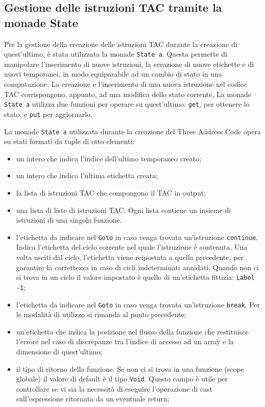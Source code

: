 \subsection{Gestione delle istruzioni TAC tramite la monade State}

Per la gestione della creazione delle istruzioni TAC durante la creazione di quest'ultimo, è stata utilizzata la monade {\tt State a}. Questa permette di manipolare l'inserimento di nuove istruzioni, la creazione di nuove etichette e di nuovi temporanei, in modo equiparabile ad un cambio di stato in una computazione. La creazione e l'inserimento di una nuova istruzione nel codice TAC corrispongono, appunto, ad una modifica dello stato corrente, La monade {\tt State a} utilizza due funzioni per operare su quest'ultimo: {\tt get}, per ottenere lo stato, e {\tt put} per aggiornarlo. 

La monade {\tt State a} utilizzata durante la creazione del Three Address Code opera su stati formati da tuple di otto elementi:
\begin{itemize}
    \item un intero che indica l'indice dell'ultimo temporaneo creato;
    \item un intero che indica l'ultima etichetta creata;
    \item la lista di istruzioni TAC che compongono il TAC in output;
    \item una lista di liste di istruzioni TAC. Ogni lista contiene un insieme di istruzioni di una singola funzione. 
    \item l'etichetta da indicare nel {\tt Goto} in caso venga trovata un'istruzione {\tt continue}. Indica l'etichetta del ciclo corrente nel quale l'istruzione è contenuta. Una volta usciti dal ciclo, l'etichetta viene reipostata a quella precedente, per garantire la correttezza in caso di cicli indeterminati annidati. Quando non ci si trova in un ciclo il valore impostato è quello di un'etichetta fittizia: {\tt Label -1};
    \item l'etichetta da indicare nel {\tt Goto} in caso venga trovata un'istruzione {\tt break}. Per le modalità di utilizzo si rimanda al punto precedente;
    \item un'etichetta che indica la posizione nel flusso della funzione che restituisce l'errore nel caso di discrepanze tra l'indice di accesso ad un array e la dimensione di quest'ultimo;
    \item il tipo di ritorno della funzione. Se non ci si trova in una funzione (scope globale) il valore di default è il tipo {\tt Void}. Questo campo è utile per controllare se vi sia la necessità di eseguire l'operazione di cast sull'espressione ritornata da un eventuale return;
\end{itemize}

